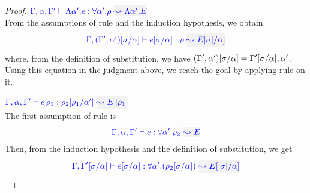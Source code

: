 \begin{proof}
\item[\fbox{\rref{Ty-TAbs}}]\quad$\wte{\tenv,\alpha,\tenv'}{\Abs{\alpha'}{e}}{\tall{\alpha'}{\rulet}}{\Abs{\alpha'}{E}}$\\

From the assumptions of rule  and the induction hypothesis, we obtain
\begin{equation*}
\wte{\tenv,(\tenv',\alpha')[\suty/\alpha]}{e[\suty/\alpha]}{\rulet}{E\etrans{\suty}/\alpha]}
\end{equation*}
where, from the definition of substitution, we have
$(\Gamma',\alpha')[\sigma/\alpha] = \Gamma'[\sigma/\alpha],\alpha'$. Using this equation in the judgment above, we reach the goal by applying rule  on it.\\

\item[\fbox{\rref{Ty-TApp}}]\quad
$\wte{\tenv,\alpha,\tenv'}{\mmapp{e}{\rulet_1}}{\rulet_2[\rulet_1/\alpha']}{\mmapp{E}{\etrans{\rulet_1}}}$\\

The first assumption of rule  is
\begin{equation*}
\wte{\tenv,\alpha,\tenv'}{e}{\tall{\alpha'}{\rulet_2}}{E}
\end{equation*}
Then, from the induction hypothesis and the definition of substitution, we get
\begin{equation*}
\wte{\tenv,\tenv'[\suty/\alpha]}{e[\suty/\alpha]}{\tall{\alpha'}{(\rulet_2[\suty/\alpha])}}{E[\etrans{\suty}/\alpha]}
\end{equation*}


\end{proof}
